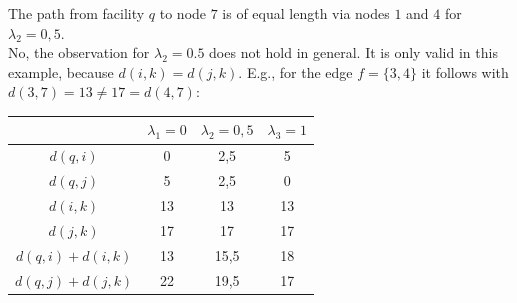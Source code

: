 \begin{enumerate}
\begin{solution}
	The path from facility $q$ to node $7$ is of equal length via nodes $1$ and $4$ for $\lambda_2=0,5$.\\
	
	No, the observation for $\lambda_2=0.5$ does not hold in general. It is only valid in this example, because $d\left(i,k\right)=d\left(j,k\right)$. E.g., for the edge $f=\{3,4\}$ it follows with $d(3,7)= 13 \neq 17 = d(4,7)$:
		\begin{center}
		\begin{tabular}{c|c|c|c}
			&$\lambda_1=0$&$\lambda_2=0,5$&$\lambda_3=1$\\
			\hline
			$d\left(q,i\right)$&0&2,5&5\\
			$d\left(q,j\right)$&5&2,5&0\\
			$d\left(i,k\right)$&13&13&13\\
			$d\left(j,k\right)$&17&17&17\\
			$d\left(q,i\right)+d\left(i,k\right)$&13&15,5&18\\
			$d\left(q,j\right)+d\left(j,k\right)$&22&19,5&17\\
		\end{tabular}
	\end{center}
	\end{solution}
\end{enumerate}